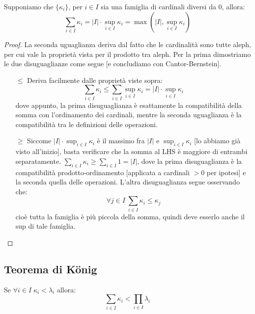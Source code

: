 \documentclass[11pt]{scrartcl}
\begin{document}
\begin{proposition}
	Supponiamo che $\{\kappa_i\}$, per $i \in I$ sia una famiglia di cardinali diversi da 0, allora:
	\[ \sum_{i \in I}\kappa_i = |I| \cdot \sup_{i \in I} \kappa_i = \max\left(|I|, \sup_{i \in I}\kappa_i\right)
		\]
\end{proposition}

\begin{proof}
	La seconda uguaglianza deriva dal fatto che le cardinalità sono tutte aleph, per cui vale la proprietà vista per il prodotto tra aleph. Per la prima dimostriamo le due disuguaglianze come segue [e concludiamo con Cantor-Bernstein].
	\begin{itemize}
		\item[$\boxed{\leq}$] Deriva facilmente dalle proprietà viste sopra:
		\[ \sum_{i \in I} \kappa_i \leq \sum_{i \in I} \sup_{i \in I}\kappa_i = |I| \cdot \sup_{i \in I} \kappa_i
			\]
		dove appunto, la prima disuguaglianza è esattamente la compatibilità della somma con l'ordinamento dei cardinali, mentre la seconda uguaglianza è la compatibilità tra le definizioni delle operazioni.
		\item[$\boxed{\geq}$] Siccome $|I| \cdot \sup_{i \in I} \kappa_i$ è il massimo fra $|I|$ e $\sup_{i \in I} \kappa_i$ [lo abbiamo già visto all'inizio], basta verificare che la somma al LHS è maggiore di entrambi separatamente.
		$\sum_{i \in I}\kappa_i \geq \sum_{i \in I} 1 = |I|$, dove la prima disuguaglianza è la compatibilità prodotto-ordinamento [applicata a cardinali $>0$ per ipotesi] e la seconda quella delle operazioni. L'altra disuguaglianza segue osservando che:
		\[ \forall j \in I \; \sum_{i \in I} \kappa_i \leq \kappa_j
			\]
		cioè tutta la famiglia è più piccola della somma, quindi deve esserlo anche il sup di tale famiglia.
	\end{itemize}
\end{proof}

\subsection{Teorema di König}

\begin{proposition}
	Se $\forall i \in I \; \kappa_i < \lambda_i$ allora:
	\[ \sum_{i \in I} \kappa_i < \prod_{i \in I} \lambda_i
		\]
\end{proposition}
\end{document}
